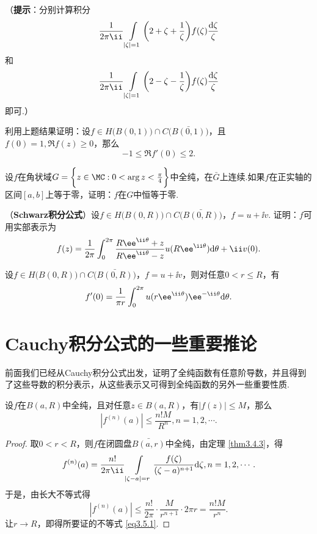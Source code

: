 \begin{xiti}
（\textbf{提示}：分别计算积分
\[\frac1{2\pi\ii}\int\limits_{|\zeta|=1}\bigg(2+\zeta+\frac1\zeta\bigg)f(\zeta)
\frac{\textrm d\zeta}\zeta\]
和
\[\frac1{2\pi\ii}\int\limits_{|\zeta|=1}\bigg(2-\zeta-\frac1\zeta\bigg)f(\zeta)
\frac{\textrm d\zeta}\zeta\]
即可.）
\item 利用上题结果证明：设$f\in H\big(B(0,1)\big)\cap C\big(\bar{B(0,1)}\big)$，且$f(0)=1,\Re f(z)\ge0$，那么
\[-1\le\Re f'(0)\le 2.\]
\item 设$f$在角状域$G=\bigg\{z\in\MC:0<\arg z<\frac\pi4\bigg\}$中全纯，在$\bar G$上连续.如果$f$在正实轴的区间$[a,b]$上等于零，证明：$f$在$G$中恒等于零.
\item （\textbf{Schwarz积分公式}）设$f\in H\big(B(0,R)\big)\cap C\big(\bar{B(0,R)}\big)$，$f=u+\ii v$. 证明：$f$可用实部表示为
    \[f(z)=\frac1{2\pi}\int_0^{2\pi}\frac{R\ee^{\ii\theta}+z}{R\ee^{\ii\theta}-z}
    u(R\ee^{\ii\theta})\textrm d\theta+\ii v(0).\]
\item 设$f\in H\big(B(0,R)\big)\cap C\big(\bar{B(0,R)}\big)$，$f=u+\ii v$，则对任意$0<r\le R$，有
    \[f'(0)=\frac1{\pi r}\int_0^{2\pi}u(r\ee^{\ii\theta})\ee^{-\ii\theta}\textrm d\theta.\]
\end{xiti}

\section{Cauchy积分公式的一些重要推论\label{sec3.5}}
前面我们已经从Cauchy积分公式出发，证明了全纯函数有任意阶导数，并且得到了这些导数的积分表示，从这些表示又可得到全纯函数的另外一些重要性质.
\begin{theorem}\label{thm3.5.1}
设$f$在$B(a,R)$中全纯，且对任意$z\in B(a,R)$，有$|f(z)|\le M$，那么
\begin{equation}\label{eq3.5.1}
|f^{(n)}(a)|\le\frac{n!M}{R^n},n=1,2,\cdots.
\end{equation}
\begin{proof}
取$0<r<R$，则$f$在闭圆盘$\bar{B(a,r)}$中全纯，由定理 \ref{thm3.4.3}，得
\begin{equation*}
  f^{(n)}(a)=\frac{n!}{2\pi\ii}\int\limits_{|\zeta-a|=r}\frac{f(\zeta)}{(\zeta-a)^{n+1}}\textrm d\zeta,n=1,2,\cdots.
\end{equation*}
于是，由长大不等式得
\[|f^{(n)}(a)|\le\frac{n!}{2\pi}\cdot\frac M{r^{n+1}}\cdot2\pi r=\frac{n!M}{r^n}.\]
让$r\to R$，即得所要证的不等式 \eqref{eq3.5.1}.
\end{proof}
\end{theorem}


